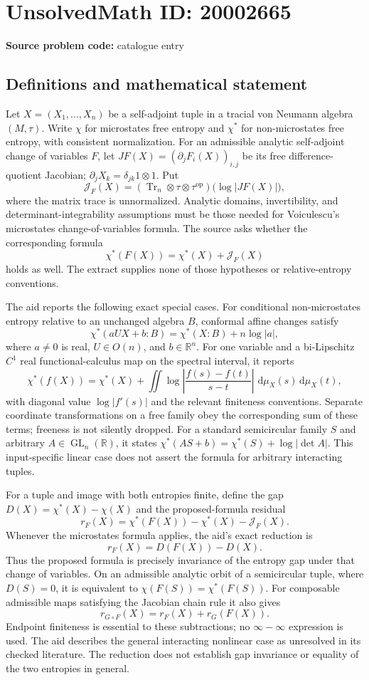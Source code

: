 \documentclass[11pt]{article}
\newcommand{\R}{\mathbb{R}}
\newcommand{\dd}{\,\mathrm{d}}
\begin{document}
\section*{UnsolvedMath ID: 20002665}
\textbf{Source problem code:} catalogue entry
\subsection{Definitions and mathematical statement}
Let $X=(X_1,\ldots,X_n)$ be a self-adjoint tuple in a tracial von Neumann algebra $(M,\tau)$. Write $\chi$ for microstates free entropy and $\chi^*$ for non-microstates free entropy, with consistent normalization. For an admissible analytic self-adjoint change of variables $F$, let $JF(X)=(\partial_jF_i(X))_{i,j}$ be its free difference-quotient Jacobian; $\partial_jX_k=\delta_{jk}1\otimes1$. Put
\[
 \mathcal J_F(X)=(\operatorname{Tr}_n\otimes\tau\otimes\tau^{\mathrm{op}})
 \bigl(\log|JF(X)|\bigr),
\]
where the matrix trace is unnormalized. Analytic domains, invertibility, and determinant-integrability assumptions must be those needed for Voiculescu's microstates change-of-variables formula. The source asks whether the corresponding formula
\[
 \chi^*(F(X))=\chi^*(X)+\mathcal J_F(X)
\]
holds as well. The extract supplies none of those hypotheses or relative-entropy conventions.

The aid reports the following exact special cases. For conditional non-microstates entropy relative to an unchanged algebra $B$, conformal affine changes satisfy
\[
 \chi^*(aUX+b:B)=\chi^*(X:B)+n\log|a|,
\]
where $a\ne0$ is real, $U\in O(n)$, and $b\in\R^n$. For one variable and a bi-Lipschitz $C^1$ real functional-calculus map on the spectral interval, it reports
\[
 \chi^*(f(X))=\chi^*(X)+
 \iint\log\left|\frac{f(s)-f(t)}{s-t}\right|\,\dd\mu_X(s)\dd\mu_X(t),
\]
with diagonal value $\log|f'(s)|$ and the relevant finiteness conventions. Separate coordinate transformations on a free family obey the corresponding sum of these terms; freeness is not silently dropped. For a standard semicircular family $S$ and arbitrary $A\in\operatorname{GL}_n(\R)$, it states $\chi^*(AS+b)=\chi^*(S)+\log|\det A|$. This input-specific linear case does not assert the formula for arbitrary interacting tuples.

For a tuple and image with both entropies finite, define the gap $D(X)=\chi^*(X)-\chi(X)$ and the proposed-formula residual
\[
 r_F(X)=\chi^*(F(X))-\chi^*(X)-\mathcal J_F(X).
\]
Whenever the microstates formula applies, the aid's exact reduction is
\[
 r_F(X)=D(F(X))-D(X).
\]
Thus the proposed formula is precisely invariance of the entropy gap under that change of variables. On an admissible analytic orbit of a semicircular tuple, where $D(S)=0$, it is equivalent to $\chi(F(S))=\chi^*(F(S))$. For composable admissible maps satisfying the Jacobian chain rule it also gives
\[
 r_{G\circ F}(X)=r_F(X)+r_G(F(X)).
\]
Endpoint finiteness is essential to these subtractions; no $\infty-\infty$ expression is used. The aid describes the general interacting nonlinear case as unresolved in its checked literature. The reduction does not establish gap invariance or equality of the two entropies in general.
\end{document}
